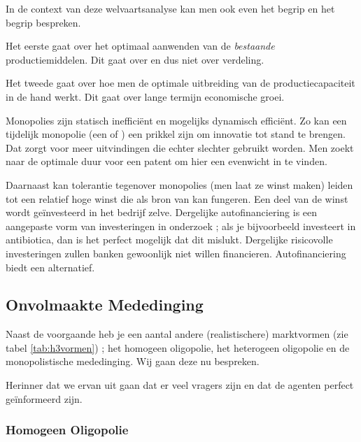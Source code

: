 \par In de context van deze welvaartsanalyse kan men ook even het begrip  en het begrip  bespreken.
\par Het eerste gaat over het optimaal aanwenden van de \textit{bestaande} productiemiddelen. Dit gaat over  en dus niet over verdeling.
\par Het tweede gaat over hoe men de optimale uitbreiding van de productiecapaciteit in de hand werkt. Dit gaat over lange termijn economische groei.\\

\par Monopolies zijn statisch ineffici\"ent en mogelijks dynamisch effici\"ent. Zo kan een tijdelijk monopolie (een  of ) een prikkel zijn om innovatie tot stand te brengen. Dat zorgt voor meer uitvindingen die echter slechter gebruikt worden. Men zoekt naar de optimale duur voor een patent om hier een evenwicht in te vinden.
\par Daarnaast kan tolerantie tegenover monopolies (men laat ze winst maken) leiden tot een relatief hoge winst die als bron van  kan fungeren. Een deel van de winst wordt ge\"investeerd in het bedrijf zelve. Dergelijke autofinanciering is een aangepaste vorm van investeringen in onderzoek ; als je bijvoorbeeld investeert in antibiotica, dan is het perfect mogelijk dat dit mislukt. Dergelijke risicovolle investeringen zullen banken gewoonlijk niet willen financieren. Autofinanciering biedt een alternatief.

\subsection{Onvolmaakte Mededinging}

Naast de voorgaande heb je een aantal andere (realistischere) marktvormen (zie tabel \ref{tab:h3vormen}) ; het homogeen oligopolie, het heterogeen oligopolie en de monopolistische mededinging. Wij gaan deze nu bespreken.
\par Herinner dat we ervan uit gaan dat er veel vragers zijn en dat de agenten perfect ge\"informeerd zijn.

\subsubsection{Homogeen Oligopolie}

